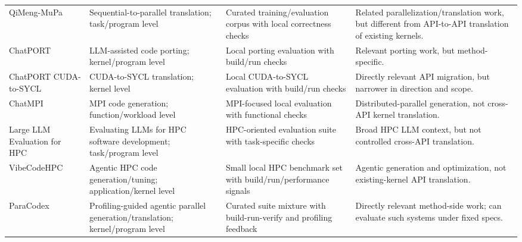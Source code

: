 \begin{table}[p]
\begin{tabularx}{\textwidth}{@{}
>{\RaggedRight\arraybackslash}p{}
>{\RaggedRight\arraybackslash}p{}
>{\RaggedRight\arraybackslash}p{}
>{\RaggedRight\arraybackslash}X
@{}}
QiMeng-MuPa~\cite{QiMengMuPa2025}
& Sequential-to-parallel translation; task/program level
& Curated training/evaluation corpus with local correctness checks
& Related parallelization/translation work, but different from API-to-API translation of existing kernels. \\

ChatPORT~\cite{ChatPORT2025}
& LLM-assisted code porting; kernel/program level
& Local porting evaluation with build/run checks
& Relevant porting work, but method-specific. \\

ChatPORT CUDA-to-SYCL~\cite{ChatPORTSYCL2025}
& CUDA-to-SYCL translation; kernel level
& Local CUDA-to-SYCL evaluation with build/run checks
& Directly relevant API migration, but narrower in direction and scope. \\

ChatMPI~\cite{ChatMPI2026}
& MPI code generation; function/workload level
& MPI-focused local evaluation with functional checks
& Distributed-parallel generation, not cross-API kernel translation. \\

Large LLM Evaluation for HPC~\cite{LargeLLMEvalHPC2024}
& Evaluating LLMs for HPC software development; task/program level
& HPC-oriented evaluation suite with task-specific checks
& Broad HPC LLM context, but not controlled cross-API translation. \\

VibeCodeHPC~\cite{VibeCodeHPC2026}
& Agentic HPC code generation/tuning; application/kernel level
& Small local HPC benchmark set with build/run/performance signals
& Agentic generation and optimization, not existing-kernel API translation. \\

ParaCodex~\cite{ParaCodex2026}
& Profiling-guided agentic parallel generation/translation; kernel/program level
& Curated suite mixture with build-run-verify and profiling feedback
& Directly relevant method-side work; \parbench{} can evaluate such systems under fixed specs. \\

\bottomrule
\end{tabularx}
\end{table}

